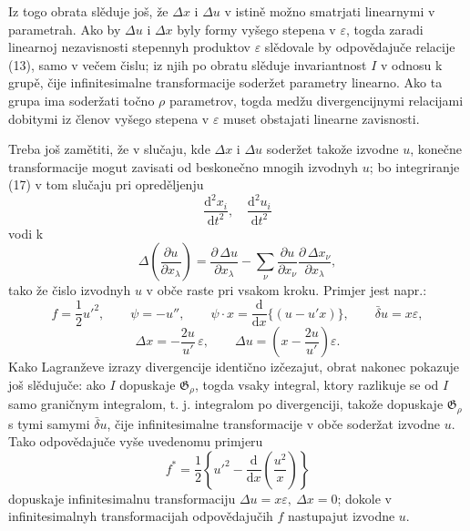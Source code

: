 \documentclass[11pt]{article}
\providecommand{\G}{\mathfrak G}
\providecommand{\eps}{\varepsilon}
\providecommand{\D}{\Delta}
\providecommand{\p}{\partial}
\providecommand{\dd}{\mathrm d}
\providecommand{\bd}{\bar{\delta}}
\begin{document}
Iz togo obrata slěduje još, že \(\D x\) i \(\D u\) v istině možno smatrjati linearnymi v parametrah. Ako by \(\D u\) i \(\D x\) byly formy vyšego stepena v \(\eps\), togda zaradi linearnoj nezavisnosti stepennyh produktov \(\eps\) slědovale by odpovědajuče relacije (13), samo v večem čislu; iz njih po obratu slěduje invariantnost \(I\) v odnosu k grupě, čije infinitesimalne transformacije soderžet parametry linearno. Ako ta grupa ima soderžati točno \(\rho\) parametrov, togda medžu divergencijnymi relacijami dobitymi iz členov vyšego stepena v \(\eps\) muset obstajati linearne zavisnosti.

Treba još zamětiti, že v slučaju, kde \(\D x\) i \(\D u\) soderžet takože izvodne \(u\), konečne transformacije mogut zavisati od beskonečno mnogih izvodnyh \(u\); bo integriranje (17) v tom slučaju pri opreděljenju
\[
\frac{\dd^2x_i}{\dd t^2},\quad \frac{\dd^2u_i}{\dd t^2}
\]
vodi k
\[
\D\!\left(\frac{\p u}{\p x_\lambda}\right)
=\frac{\p\,\D u}{\p x_\lambda}
-\sum_\nu\frac{\p u}{\p x_\nu}
\frac{\p\,\D x_\nu}{\p x_\lambda},
\]
tako že čislo izvodnyh \(u\) v obče raste pri vsakom kroku. Primjer jest napr.:
\[
f=\frac12 u'^2,\qquad
\psi=-u'',\qquad
\psi\cdot x=\frac{\dd}{\dd x}\{(u-u'x)\},\qquad
\bd u=x\eps,
\]
\[
\D x=-\frac{2u}{u'}\,\eps,\qquad
\D u=\left(x-\frac{2u}{u'}\right)\eps.
\]
Kako Lagranževe izrazy divergencije identično izčezajut, obrat nakonec pokazuje još slědujuče: ako \(I\) dopuskaje \(\G_\rho\), togda vsaky integral, ktory razlikuje se od \(I\) samo graničnym integralom, t. j. integralom po divergenciji, takože dopuskaje \(\G_\rho\) s tymi samymi \(\bd u\), čije infinitesimalne transformacije v obče soderžat izvodne \(u\). Tako odpovědajuče vyše uvedenomu primjeru
\[
f^*=\frac12\left\{u'^2-\frac{\dd}{\dd x}\left(\frac{u^2}{x}\right)\right\}
\]
dopuskaje infinitesimalnu transformaciju \(\D u=x\eps,\ \D x=0\); dokole v infinitesimalnyh transformacijah odpovědajučih \(f\) nastupajut izvodne \(u\).
\end{document}
